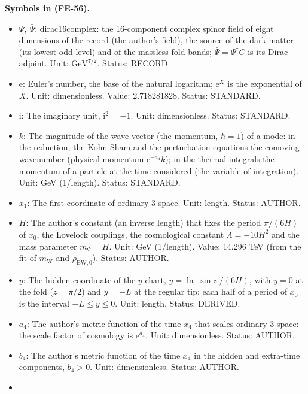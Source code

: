 \documentclass[
  10pt,
]{article}
\providecommand{\tightlist}{%
  \setlength{\itemsep}{0pt}\setlength{\parskip}{0pt}}
\begin{document}
\textbf{Symbols in (FE-56).}

\begin{itemize}
\tightlist
\item
  \(\Psi,\ \bar\Psi\): dirac16complex: the 16-component complex spinor
  field of eight dimensions of the record (the author's field), the
  source of the dark matter (its lowest odd level) and of the massless
  fold bands; \(\bar\Psi = \Psi^\dagger C\) is its Dirac adjoint. Unit:
  \(\mathrm{GeV}^{7/2}\). Status: RECORD.
\item
  \(\mathrm{e}\): Euler's number, the base of the natural logarithm;
  \(\mathrm{e}^{X}\) is the exponential of \(X\). Unit: dimensionless.
  Value: 2.718281828. Status: STANDARD.
\item
  \(\mathrm{i}\): The imaginary unit, \(\mathrm{i}^2 = -1\). Unit:
  dimensionless. Status: STANDARD.
\item
  \(k\): The magnitude of the wave vector (the momentum, \(\hbar = 1\))
  of a mode: in the reduction, the Kohn-Sham and the perturbation
  equations the comoving wavenumber (physical momentum
  \(\mathrm{e}^{-a_4}k\)); in the thermal integrals the momentum of a
  particle at the time considered (the variable of integration). Unit:
  GeV (1/length). Status: STANDARD.
\item
  \(x_1\): The first coordinate of ordinary 3-space. Unit: length.
  Status: AUTHOR.
\item
  \(H\): The author's constant (an inverse length) that fixes the period
  \(\pi/(6H)\) of \(x_0\), the Lovelock couplings, the cosmological
  constant \(\Lambda = -10H^2\) and the mass parameter \(m_\Psi = H\).
  Unit: GeV (1/length). Value: 14.296 TeV (from the fit of
  \(m_{\mathrm{W}}\) and \(\rho_{\mathrm{EW},0}\)). Status: AUTHOR.
\item
  \(y\): The hidden coordinate of the \(y\) chart,
  \(y = \ln\lvert\sin z\rvert/(6H)\), with \(y = 0\) at the fold
  (\(z = \pi/2\)) and \(y = -L\) at the regular tip; each half of a
  period of \(x_0\) is the interval \(-L \le y \le 0\). Unit: length.
  Status: DERIVED.
\item
  \(a_4\): The author's metric function of the time \(x_4\) that scales
  ordinary 3-space: the scale factor of cosmology is
  \(\mathrm{e}^{a_4}\). Unit: dimensionless. Status: AUTHOR.
\item
  \(b_4\): The author's metric function of the time \(x_4\) in the
  hidden and extra-time components, \(b_4 > 0\). Unit: dimensionless.
  Status: AUTHOR.
\item

\end{itemize}
\end{document}
